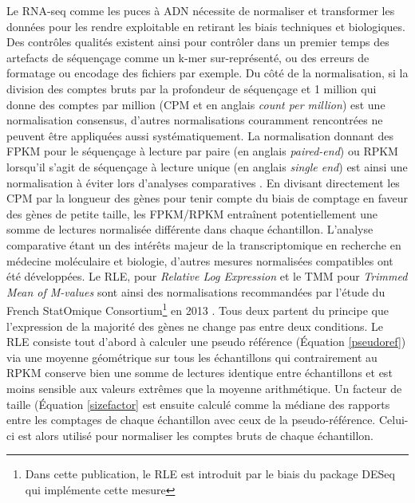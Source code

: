 Le RNA-seq comme les puces à ADN nécessite de normaliser et transformer les données pour les rendre exploitable en retirant les biais techniques et biologiques. Des contrôles qualités existent ainsi pour contrôler dans un premier temps des artefacts de séquençage comme un k-mer sur-représenté, ou des erreurs de formatage ou encodage des fichiers par exemple. Du côté de la normalisation, si la division des comptes bruts par la profondeur de séquençage et 1 million qui donne des comptes par million (CPM et en anglais \textit{count per million}) est une normalisation consensus, d'autres normalisations couramment rencontrées ne peuvent être appliquées aussi systématiquement. La normalisation donnant des FPKM pour le séquençage à lecture par paire (en anglais \textit{paired-end}) ou RPKM lorsqu'il s'agit de séquençage à lecture unique (en anglais \textit{single end}) est ainsi une normalisation à éviter lors d'analyses comparatives \cite{Wagner2012Dec}. En divisant directement les CPM par la longueur des gènes pour tenir compte du biais de comptage en faveur des gènes de petite taille, les FPKM/RPKM entraînent potentiellement une somme de lectures normalisée différente dans chaque échantillon. L'analyse comparative étant un des intérêts majeur de la transcriptomique en recherche en médecine moléculaire et biologie, d'autres mesures normalisées compatibles ont été développées. Le RLE, pour \textit{Relative Log Expression} \cite{Anders2010Oct} et le TMM pour \textit{Trimmed Mean of M-values} \cite{Robinson2010Mar} sont ainsi des normalisations recommandées par l'étude du French StatOmique Consortium\footnote{Dans cette publication, le RLE est introduit par le biais du package DESeq \cite{Anders2010Oct} qui implémente cette mesure} en 2013 \cite{Dillies2013Nov}. Tous deux partent du principe que l'expression de la majorité des gènes ne change pas entre deux conditions. Le RLE consiste tout d'abord à calculer une pseudo référence (Équation \ref{pseudoref}) via une moyenne géométrique sur tous les échantillons \cite{Gandolfo2018Feb} qui contrairement au RPKM conserve bien une somme de lectures identique entre échantillons et est moins sensible aux valeurs extrêmes que la moyenne arithmétique. Un facteur de taille (Équation \ref{sizefactor} est ensuite calculé comme la médiane des rapports entre les comptages de chaque échantillon avec ceux de la pseudo-référence. Celui-ci est alors utilisé pour normaliser les comptes bruts de chaque échantillon.

